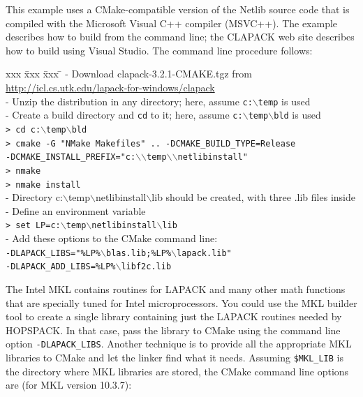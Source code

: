 \medskip
{}
This example uses a CMake-compatible version of the Netlib source code that
is compiled with the Microsoft Visual C++ compiler (MSVC++).
The example describes how to build from the command line; the CLAPACK web site
describes how to build using Visual Studio.
The command line procedure follows:
\begin{tabbing}
  xxx \= xxx \= xxx \= \kill
  \> - Download {\sf clapack-3.2.1-CMAKE.tgz} from
       \href{http://icl.cs.utk.edu/lapack-for-windows/clapack/}
            {http://icl.cs.utk.edu/lapack-for-windows/clapack}  \\
  \> - Unzip the distribution in any directory;
       here, assume {\tt c:$\backslash$temp} is used  \\
  \> - Create a build directory and {\tt cd} to it;
       here, assume {\tt c:$\backslash$temp$\backslash$bld} is used  \\
  \> \> {\tt > cd c:$\backslash$temp$\backslash$bld}  \\
  \> \> {\tt > cmake -G "NMake Makefiles" .. -DCMAKE\_BUILD\_TYPE=Release}  \\
  \> \> \> {\tt -DCMAKE\_INSTALL\_PREFIX="c:$\backslash$$\backslash$temp$\backslash$$\backslash$netlibinstall"}  \\
  \> \> {\tt > nmake}  \\
  \> \> {\tt > nmake install}  \\
  \> - Directory {\sf c:$\backslash$temp$\backslash$netlibinstall$\backslash$lib}
       should be created, with three {\sf .lib} files inside \\
  \> - Define an environment variable  \\
  \> \> {\tt > set LP=c:$\backslash$temp$\backslash$netlibinstall$\backslash$lib}  \\
  \> - Add these options to the CMake command line:  \\
  \> \> \> {\tt -DLAPACK\_LIBS="\%LP\%$\backslash$blas.lib;\%LP\%$\backslash$lapack.lib"}  \\
  \> \> \> {\tt -DLAPACK\_ADD\_LIBS=\%LP\%$\backslash$libf2c.lib}
\end{tabbing}

\medskip
{}
The Intel MKL contains routines for LAPACK and many other math functions that
are specially tuned for Intel microprocessors.  You could use the MKL builder
tool to create a single library containing just the LAPACK routines needed
by HOPSPACK.  In that case, pass the library to CMake using the command line
option {\tt -DLAPACK\_LIBS}.
Another technique is to provide all the appropriate MKL libraries to CMake and
let the linker find what it needs.  Assuming {\tt \$MKL\_LIB} is the directory
where MKL libraries are stored, the CMake command line options are
(for MKL version 10.3.7):

